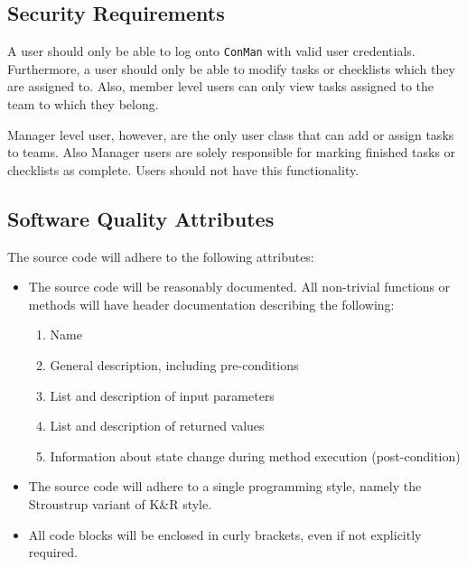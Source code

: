 \documentclass{article}
\begin{document}
\subsection{Security Requirements}
A user should only be able to log onto \texttt{ConMan} with valid user credentials.
Furthermore, a user should only be able to modify tasks or checklists which they are assigned to.
Also, member level users can only view tasks assigned to the team to which they belong.

Manager level user, however, are the only user class that can add or assign tasks to teams.  Also Manager users are solely responsible for marking finished tasks or checklists as complete.  Users should not have this functionality.


\subsection{Software Quality Attributes}
The source code will adhere to the following attributes:
\begin{itemize}
    \item The source code will be reasonably documented.  All non-trivial functions or methods will have header documentation describing the following:
        \begin{enumerate}
            \item Name
            \item General description, including pre-conditions
            \item List and description of input parameters
            \item List and description of returned values
            \item Information about state change during method execution (post-condition)
        \end{enumerate}
    \item The source code will adhere to a single programming style, namely the Stroustrup variant of K\&R style.
    \item All code blocks will be enclosed in curly brackets, even if not explicitly required.
\end{itemize}
\end{document}
